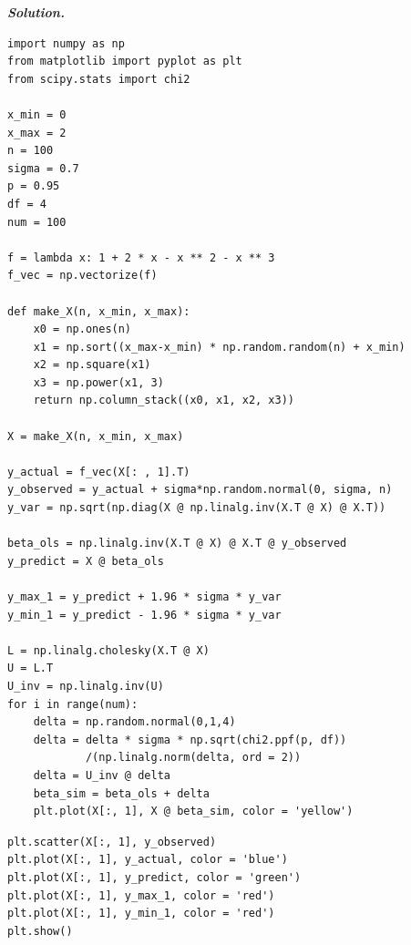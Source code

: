 \documentclass[12pt]{article}
\newenvironment{solution}[1][\it{Solution}]{\textbf{#1. } }{\vspace{.5cm}}
\begin{document}
\begin{solution}
\begin{figure}
\end{figure}

\begin{tcolorbox}[width=\linewidth, sharp corners=all, colback=white!95!black]

    \begin{verbatim}
import numpy as np
from matplotlib import pyplot as plt
from scipy.stats import chi2

x_min = 0
x_max = 2
n = 100
sigma = 0.7
p = 0.95
df = 4
num = 100

f = lambda x: 1 + 2 * x - x ** 2 - x ** 3
f_vec = np.vectorize(f)

def make_X(n, x_min, x_max):
    x0 = np.ones(n)
    x1 = np.sort((x_max-x_min) * np.random.random(n) + x_min)
    x2 = np.square(x1)
    x3 = np.power(x1, 3)
    return np.column_stack((x0, x1, x2, x3))

X = make_X(n, x_min, x_max)

y_actual = f_vec(X[: , 1].T)
y_observed = y_actual + sigma*np.random.normal(0, sigma, n)
y_var = np.sqrt(np.diag(X @ np.linalg.inv(X.T @ X) @ X.T))

beta_ols = np.linalg.inv(X.T @ X) @ X.T @ y_observed
y_predict = X @ beta_ols

y_max_1 = y_predict + 1.96 * sigma * y_var
y_min_1 = y_predict - 1.96 * sigma * y_var

L = np.linalg.cholesky(X.T @ X)
U = L.T
U_inv = np.linalg.inv(U)
for i in range(num):
    delta = np.random.normal(0,1,4)
    delta = delta * sigma * np.sqrt(chi2.ppf(p, df))
            /(np.linalg.norm(delta, ord = 2))
    delta = U_inv @ delta
    beta_sim = beta_ols + delta
    plt.plot(X[:, 1], X @ beta_sim, color = 'yellow')
\end{verbatim}
\end{tcolorbox}
\begin{tcolorbox}[width=\linewidth, sharp corners=all, colback=white!95!black]

    \begin{verbatim}
plt.scatter(X[:, 1], y_observed)
plt.plot(X[:, 1], y_actual, color = 'blue')
plt.plot(X[:, 1], y_predict, color = 'green')
plt.plot(X[:, 1], y_max_1, color = 'red')
plt.plot(X[:, 1], y_min_1, color = 'red')
plt.show()
\end{verbatim}
\end{tcolorbox}

\end{solution}
\end{document}
